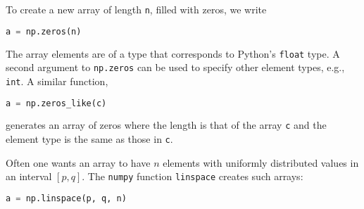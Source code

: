 \documentclass[graybox,sectrefs,envcountresetchap,open=right,final]{svmonodo}
\begin{document}
To create a new array of length \texttt{n}, filled with zeros, we write



\begin{lstlisting}[language=Python,style=simple,xleftmargin=2mm]
a = np.zeros(n)

\end{lstlisting}

The array elements are of a type that corresponds to Python's
\texttt{float} type. A second argument to \texttt{np.zeros} can be used to
specify other element types, e.g., \texttt{int}.
A similar function,



\begin{lstlisting}[language=Python,style=simple,xleftmargin=2mm]
a = np.zeros_like(c)

\end{lstlisting}

generates an array of zeros where the length is that of the array \texttt{c}
and the element type is the same as those in \texttt{c}.


Often one wants an array to have $n$ elements with uniformly
distributed values in an interval $[p,q]$. The \texttt{numpy} function
\texttt{linspace} creates such arrays:



\begin{lstlisting}[language=Python,style=simple,xleftmargin=2mm]
a = np.linspace(p, q, n)

\end{lstlisting}
\end{document}

